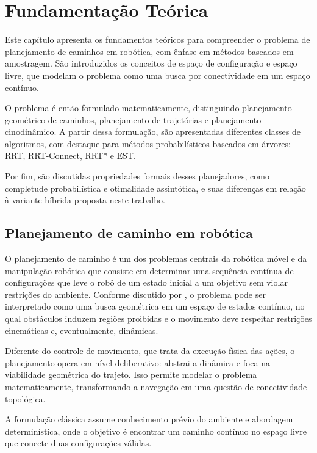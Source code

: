 \chapter{Fundamentação Teórica}\label{cap:fundamentacao}

Este capítulo apresenta os fundamentos teóricos para compreender o problema de planejamento de caminhos em robótica, com ênfase em métodos baseados em amostragem. São introduzidos os conceitos de espaço de configuração e espaço livre, que modelam o problema como uma busca por conectividade em um espaço contínuo.

O problema é então formulado matematicamente, distinguindo planejamento geométrico de caminhos, planejamento de trajetórias e planejamento cinodinâmico. A partir dessa formulação, são apresentadas diferentes classes de algoritmos, com destaque para métodos probabilísticos baseados em árvores: RRT, RRT-Connect, RRT* e EST.

Por fim, são discutidas propriedades formais desses planejadores, como completude probabilística e otimalidade assintótica, e suas diferenças em relação à variante híbrida proposta neste trabalho.

\section{Planejamento de caminho em robótica}\label{sec:planejamento_caminho}

O planejamento de caminho é um dos problemas centrais da robótica móvel e da manipulação robótica que consiste em determinar uma sequência contínua de configurações que leve o robô de um estado inicial a um objetivo sem violar restrições do ambiente. Conforme discutido por \citet{choset2005principles}, o problema pode ser interpretado como uma busca geométrica em um espaço de estados contínuo, no qual obstáculos induzem regiões proibidas e o movimento deve respeitar restrições cinemáticas e, eventualmente, dinâmicas.

Diferente do controle de movimento, que trata da execução física das ações, o planejamento opera em nível deliberativo: abstrai a dinâmica e foca na viabilidade geométrica do trajeto. Isso permite modelar o problema matematicamente, transformando a navegação em uma questão de conectividade topológica.

A formulação clássica assume conhecimento prévio do ambiente e abordagem determinística, onde o objetivo é encontrar um caminho contínuo no espaço livre que conecte duas configurações válidas.

